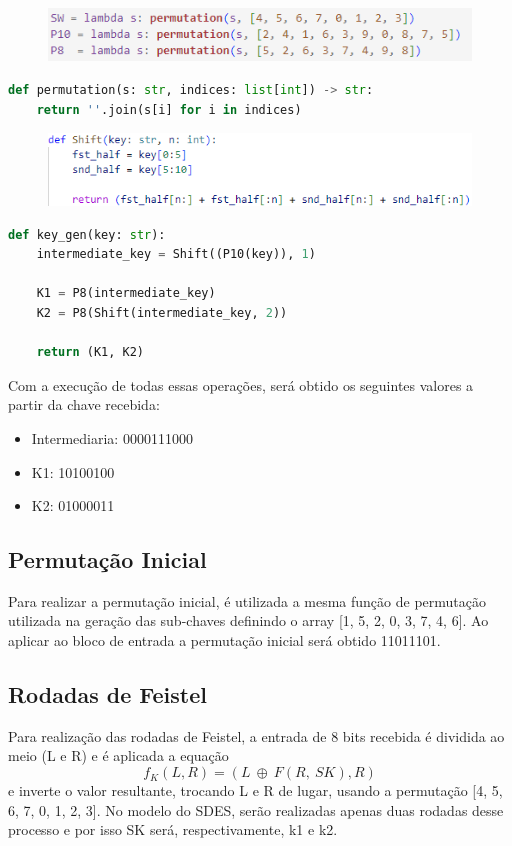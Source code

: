 \documentclass[12pt]{article}
\begin{document}
\begin{figure}[h]
    \centering
    \includegraphics[width = 0.8\linewidth]{Imagens/Permutacoes.png}  
    \label{fig:Permutacoes}
\end{figure}

\begin{lstlisting}[language=Python]
def permutation(s: str, indices: list[int]) -> str:
    return ''.join(s[i] for i in indices)
\end{lstlisting}

\begin{figure}[h]
    \centering
    \includegraphics[width = 0.8\linewidth]{Imagens/Shift.png}  
    \label{fig:Shift}
\end{figure}

\begin{lstlisting}[language=Python]
def key_gen(key: str):
    intermediate_key = Shift((P10(key)), 1)

    K1 = P8(intermediate_key)
    K2 = P8(Shift(intermediate_key, 2))

    return (K1, K2)
\end{lstlisting}

Com a execução de todas essas operações, será obtido os seguintes valores a partir da chave recebida:
\begin{itemize}
  \item Intermediaria: 0000111000
  \item K1: 10100100
  \item K2: 01000011
\end{itemize}

\subsection{Permutação Inicial}
Para realizar a permutação inicial, é utilizada a mesma função de permutação utilizada na geração das sub-chaves definindo o array [1, 5, 2, 0, 3, 7, 4, 6]. Ao aplicar ao bloco de entrada a permutação inicial será obtido 11011101.

\subsection{Rodadas de Feistel}
Para realização das rodadas de Feistel, a entrada de 8 bits recebida é dividida ao meio (L e R) e é aplicada a equação $$f_{K}(L, R) = (L \  \oplus  \  F(R, \ SK), R)$$ e inverte o valor resultante, trocando L e R de lugar, usando a permutação [4, 5, 6, 7, 0, 1, 2, 3]. No modelo do SDES, serão realizadas apenas duas rodadas desse processo e por isso SK será, respectivamente, k1 e k2.
\end{document}

